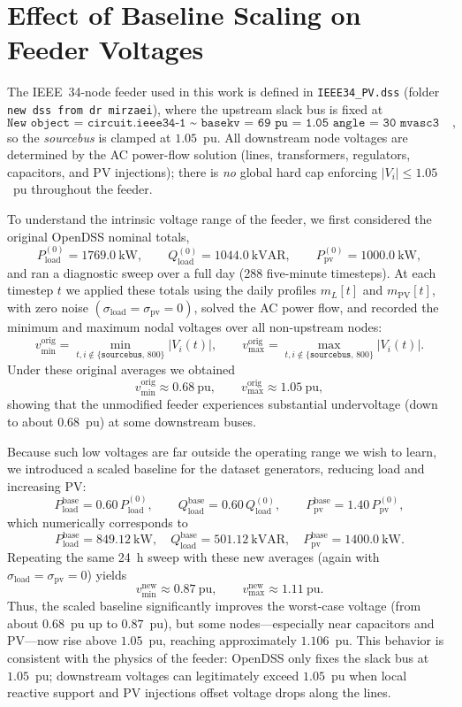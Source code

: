 \documentclass[11pt]{article}
\begin{document}
\section{Effect of Baseline Scaling on Feeder Voltages}

The IEEE~34-node feeder used in this work is defined in \texttt{IEEE34\_PV.dss} (folder \texttt{new dss from dr mirzaei}), where the upstream slack bus is fixed at
\[
\texttt{New object = circuit.ieee34-1 \ \textasciitilde{} basekv = 69 \ pu = 1.05 \ angle = 30 \ mvasc3 = 200000},
\]
so the \emph{sourcebus} is clamped at \(1.05\)~pu. All downstream node voltages are determined by the AC power-flow solution (lines, transformers, regulators, capacitors, and PV injections); there is \emph{no} global hard cap enforcing \(|V_i| \le 1.05\)~pu throughout the feeder.

To understand the intrinsic voltage range of the feeder, we first considered the original OpenDSS nominal totals,
\[
P_{\mathrm{load}}^{(0)} = 1769.0~\text{kW}, \qquad
Q_{\mathrm{load}}^{(0)} = 1044.0~\text{kVAR}, \qquad
P_{\mathrm{pv}}^{(0)} = 1000.0~\text{kW},
\]
and ran a diagnostic sweep over a full day (288 five-minute timesteps). At each timestep \(t\) we applied these totals using the daily profiles \(m_L[t]\) and \(m_{\mathrm{PV}}[t]\), with zero noise \((\sigma_{\mathrm{load}} = \sigma_{\mathrm{pv}} = 0)\), solved the AC power flow, and recorded the minimum and maximum nodal voltages over all non-upstream nodes:
\[
v_{\min}^{\mathrm{orig}} = \min_{t,i \notin \{\texttt{sourcebus},\,800\}} |V_i(t)|, \qquad
v_{\max}^{\mathrm{orig}} = \max_{t,i \notin \{\texttt{sourcebus},\,800\}} |V_i(t)|.
\]
Under these original averages we obtained
\[
v_{\min}^{\mathrm{orig}} \approx 0.68~\text{pu}, \qquad
v_{\max}^{\mathrm{orig}} \approx 1.05~\text{pu},
\]
showing that the unmodified feeder experiences substantial undervoltage (down to about \(0.68\)~pu) at some downstream buses.

Because such low voltages are far outside the operating range we wish to learn, we introduced a scaled baseline for the dataset generators, reducing load and increasing PV:
\[
P_{\mathrm{load}}^{\mathrm{base}} = 0.60\, P_{\mathrm{load}}^{(0)}, \qquad
Q_{\mathrm{load}}^{\mathrm{base}} = 0.60\, Q_{\mathrm{load}}^{(0)}, \qquad
P_{\mathrm{pv}}^{\mathrm{base}} = 1.40\, P_{\mathrm{pv}}^{(0)},
\]
which numerically corresponds to
\[
P_{\mathrm{load}}^{\mathrm{base}} = 849.12~\text{kW}, \quad
Q_{\mathrm{load}}^{\mathrm{base}} = 501.12~\text{kVAR}, \quad
P_{\mathrm{pv}}^{\mathrm{base}} = 1400.0~\text{kW}.
\]
Repeating the same 24~h sweep with these new averages (again with \(\sigma_{\mathrm{load}}=\sigma_{\mathrm{pv}}=0\)) yields
\[
v_{\min}^{\mathrm{new}} \approx 0.87~\text{pu}, \qquad
v_{\max}^{\mathrm{new}} \approx 1.11~\text{pu}.
\]
Thus, the scaled baseline significantly improves the worst-case voltage (from about \(0.68\)~pu up to \(0.87\)~pu), but some nodes—especially near capacitors and PV—now rise above \(1.05\)~pu, reaching approximately \(1.106\)~pu. This behavior is consistent with the physics of the feeder: OpenDSS only fixes the slack bus at \(1.05\)~pu; downstream voltages can legitimately exceed \(1.05\)~pu when local reactive support and PV injections offset voltage drops along the lines.
\end{document}
